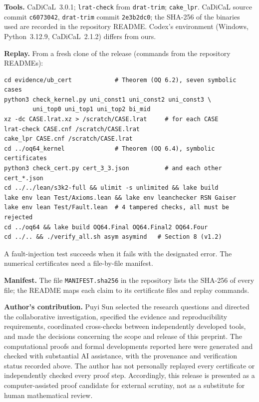 \documentclass[11pt]{amsart}
\theoremstyle{definition}
\begin{document}
\smallskip\noindent\textbf{Tools.} CaDiCaL~3.0.1; \texttt{lrat-check} from \texttt{drat-trim}; \texttt{cake\_lpr}. CaDiCaL source commit \texttt{c6073042}, \texttt{drat-trim} commit \texttt{2e3b2dc0}; the SHA-256 of the binaries used are recorded in the repository README. Codex's environment (Windows, Python~3.12.9, CaDiCaL~2.1.2) differs from ours.


\smallskip\noindent\textbf{Replay.} From a fresh clone of the release (commands from the repository READMEs):
\begin{verbatim}
cd evidence/ub_cert            # Theorem (OQ 6.2), seven symbolic cases
python3 check_kernel.py uni_const1 uni_const2 uni_const3 \
        uni_top0 uni_top1 uni_top2 bi_mid
xz -dc CASE.lrat.xz > /scratch/CASE.lrat     # for each CASE
lrat-check CASE.cnf /scratch/CASE.lrat
cake_lpr CASE.cnf /scratch/CASE.lrat
cd ../oq64_kernel              # Theorem (OQ 6.4), symbolic certificates
python3 check_cert.py cert_3_3.json          # and each other cert_*.json
cd ../../lean/s3k2-full && ulimit -s unlimited && lake build
lake env lean Test/Axioms.lean && lake env leanchecker RSN Gaiser
lake env lean Test/Fault.lean  # 4 tampered checks, all must be rejected
cd ../oq64 && lake build OQ64.Final OQ64.Final2 OQ64.Four
cd ../.. && ./verify_all.sh asym asymind   # Section 8 (v1.2)
\end{verbatim}
A fault-injection test succeeds when it fails with the designated error. The numerical certificates need a file-by-file manifest.


\smallskip\noindent\textbf{Manifest.} The file \texttt{MANIFEST.sha256} in the repository lists the SHA-256 of every file; the README maps each claim to its certificate files and replay commands.


\smallskip\noindent\textbf{Author's contribution.} Puyi Sun selected the research questions and directed the collaborative investigation, specified the evidence and reproducibility requirements, coordinated cross-checks between independently developed tools, and made the decisions concerning the scope and release of this preprint. The computational proofs and formal developments reported here were generated and checked with substantial AI assistance, with the provenance and verification status recorded above. The author has not personally replayed every certificate or independently checked every proof step. Accordingly, this release is presented as a computer-assisted proof candidate for external scrutiny, not as a substitute for human mathematical review.
\end{document}
